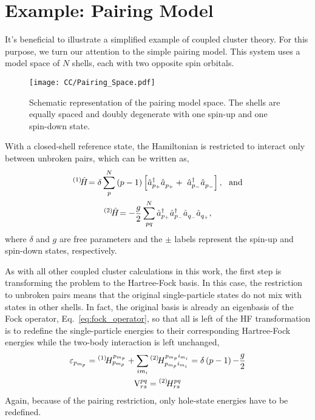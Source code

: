 \documentclass[thesis.tex]{subfiles}
\begin{document}
\section{Example: Pairing Model} \label{section:pairingmodel}

It's beneficial to illustrate a simplified example of coupled cluster theory.  For this purpose, we turn our attention to the simple pairing model.  This system uses a model space of $N$ shells, each with two opposite spin orbitals.
\begin{figure}[h]
  \centering
  \texttt{[image: CC/Pairing\_Space.pdf]}
  \caption{Schematic representation of the pairing model space.  The shells are equally spaced and doubly degenerate with one spin-up and one spin-down state.}
  \label{fig:pairing_space}
\end{figure}

With a closed-shell reference state, the Hamiltonian is restricted to interact only between unbroken pairs, which can be written as,
\begin{gather} \label{eq:pairing_ham}
  {}^{\left(1\right)}\hspace{-2pt}\hat{H}\hspace{-2pt} = \delta \sum_{p}^{N} \mathop{(p-1)} \left[ \hat{a}_{p_{+}}^{\dagger}\hat{a}_{p_{+}}^{} +\ \hat{a}_{p_{-}}^{\dagger}\hat{a}_{p_{-}}^{} \right],\ \ \text{and} \notag \\
  {}^{\left(2\right)}\hspace{-2pt}\hat{H}\hspace{-2pt} = -\frac{g}{2} \sum_{pq}^{N} \hat{a}_{p_{+}}^{\dagger}\hat{a}_{p_{-}}^{\dagger}\hat{a}_{q_{-}}^{}\hat{a}_{q_{+}}^{},
\end{gather}
where $\delta$ and $g$ are free parameters and the $\pm$ labels represent the spin-up and spin-down states, respectively.

As with all other coupled cluster calculations in this work, the first step is transforming the problem to the Hartree-Fock basis.  In this case, the restriction to unbroken pairs means that the original single-particle states do not mix with states in other shells.  In fact, the original basis is already an eigenbasis of the Fock operator, Eq.\ \eqref{eq:fock_operator}, so that all is left of the HF transformation is to redefine the single-particle energies to their corresponding Hartree-Fock energies while the two-body interaction is left unchanged,
\begin{gather}\label{eq:pairing_hf}
  \varepsilon_{p_{m_{p}}} = {}^{\left(1\right)}\hspace{-2pt}H^{p_{m_{p}}}_{p_{m_{p}}} + \sum_{im_{i}}{}^{\left(2\right)}\hspace{-2pt}H^{p_{m_{p}}i_{m_{i}}}_{p_{m_{p}}i_{m_{i}}} = \delta\mathop{(p-1)} - \frac{g}{2} \notag \\
  \text{V}^{pq}_{rs} = {}^{\left(2\right)}\hspace{-2pt}H^{pq}_{rs}
\end{gather}
Again, because of the pairing restriction, only hole-state energies have to be redefined.
\end{document}

